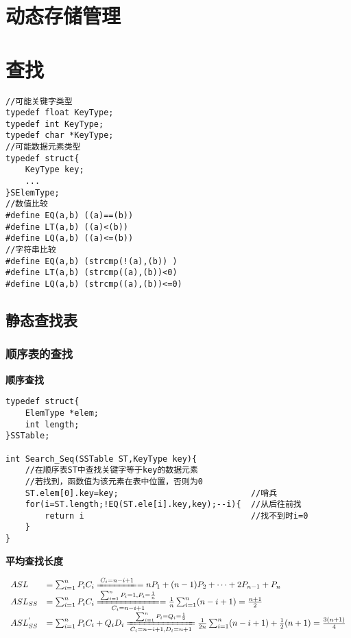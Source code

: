 \documentclass[UTF8]{ctexart}
\newcommand{\mb}[1]{\textbf{#1}}
\newcommand{\p}{\par}
\newcommand{\ma}[1]{\begin{array}{llll} #1 \end{array}}
\newcommand{\meq}[2]{\xlongequal[#2]{#1}}
\begin{document}
\newpage
\section{动态存储管理}



\newpage
\section{查找}
\begin{lstlisting}[style=v1]
//可能关键字类型
typedef float KeyType;
typedef int KeyType;
typedef char *KeyType;
//可能数据元素类型
typedef struct{
    KeyType key;
    ...
}SElemType;
//数值比较
#define EQ(a,b) ((a)==(b))
#define LT(a,b) ((a)<(b))
#define LQ(a,b) ((a)<=(b))
//字符串比较
#define EQ(a,b) (strcmp(!(a),(b)) )
#define LT(a,b) (strcmp((a),(b))<0)
#define LQ(a,b) (strcmp((a),(b))<=0)

\end{lstlisting}




\subsection{静态查找表}
\subsubsection{顺序表的查找}

\mb{顺序查找}\p
\begin{lstlisting}[style=v1]
typedef struct{ 
    ElemType *elem;
    int length;
}SSTable;

int Search_Seq(SSTable ST,KeyType key){
    //在顺序表ST中查找关键字等于key的数据元素
    //若找到，函数值为该元素在表中位置，否则为0
    ST.elem[0].key=key;                           //哨兵  
    for(i=ST.length;!EQ(ST.ele[i].key,key);--i){  //从后往前找
        return i                                  //找不到时i=0 
    }
}
\end{lstlisting}

\mb{平均查找长度}\p

$$\ma{ASL&=\sum_{i=1}^nP_iC_i\meq{C_i=n-i+1}{}=nP_1+(n-1)P_2+\dots+2P_{n-1}+P_n\\
    ASL_{SS}&=\sum_{i=1}^nP_iC_i\meq{\sum_{i=1}^nP_i=1,P_i=\frac{1}{n}}{C_i=n-i+1}=\frac{1}{n}\sum_{i=1}^n(n-i+1)=\frac{n+1}{2}\\
    ASL_{SS}^{'}&=\sum_{i=1}^nP_iC_i+Q_iD_i\meq{\sum_{i=1}^nP_i=Q_i=\frac{1}{2}}{C_i=n-i+1,D_i=n+1}\frac{1}{2n}\sum_{i=1}^n(n-i+1)+\frac{1}{2}(n+1)=\frac{3(n+1)}{4}
}$$
\end{document}
